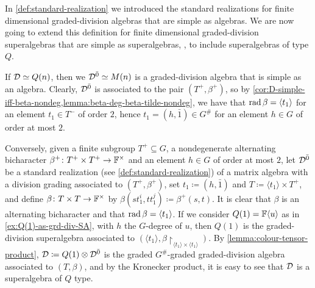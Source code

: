 
In \cref{def:standard-realization} we introduced the standard realizations for finite dimensional graded-division algebras that are simple as algebras. 
We are now going to extend this definition for finite dimensional graded-division superalgebras that are simple as superalgebras, \ie, to include superalgebras of type $Q$. 

If $\mathcal{D} \simeq Q(n)$, then we $\mathcal{D}^{\bar0} \simeq M(n)$ is a graded-division algebra that is simple as an algebra. 
Clearly, $\mathcal{D}^{\bar0}$ is associated to the pair $(T^+, \beta^+)$, so by \cref{cor:D-simple-iff-beta-nondeg,lemma:beta-deg-beta-tilde-nondeg}, we have that $\operatorname{rad} \beta = \langle t_1 \rangle$ for an element $t_1\in T^-$ of order $2$, hence $t_1 = (h, \bar 1) \in G^\#$ for an element $h \in G$ of order at most $2$. 

Conversely, given a finite subgroup $T^+ \subseteq G$, a nondegenerate alternating bicharacter $\beta^+\colon T^+ \times T^+ \to \mathbb{F}^\times$ and an element $h\in G$ of order at most $2$, let $\mathcal{D}^{\bar0}$ be a standard realization (see \cref{def:standard-realization}) of a matrix algebra with a division grading associated to $(T^+, \beta^+)$, set $t_1 \coloneqq (h, \bar 1)$ and $T \coloneqq \langle t_1 \rangle \times T^+$, and define $\beta\colon T \times T \to \mathbb{F}^\times$ by $\beta(s t_1^i, t t_1^j) \coloneqq \beta^+(s,t)$. 
It is clear that $\beta$ is an alternating bicharacter and that $\operatorname{rad} \beta = \langle t_1 \rangle$. 
If we consider $Q(1) = \mathbb{F} \langle u \rangle$ as in \cref{ex:Q(1)-as-grd-div-SA}, with $h$ the $G$-degree of $u$, then $Q(1)$ is the graded-division superalgebra associated to $(\langle t_1 \rangle, \beta\restriction_{ \langle t_1 \rangle \times \langle t_1 \rangle })$. 
By \cref{lemma:colour-tensor-product}, $\mathcal{D} \coloneqq Q(1)\otimes \mathcal{D}^{\bar0}$ is the graded $G^\#$-graded graded-division algebra associated to $(T, \beta)$, and by the Kronecker product, it is easy to see that $\mathcal{D}$ is a superalgebra of $Q$ type. 

